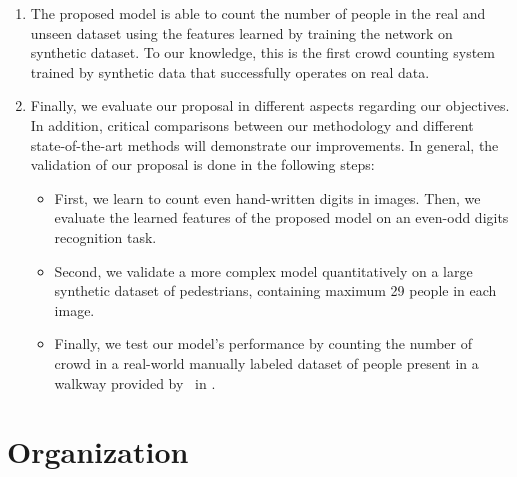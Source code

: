 \begin{enumerate}
	\item The proposed model is able to count the number of people in the real and unseen dataset using the features learned by training the network on synthetic dataset. To our knowledge, this is the first crowd counting system trained by synthetic data that successfully operates on real data. 

	\item Finally, we evaluate our proposal in different aspects regarding our objectives. In addition, critical comparisons between our methodology and different state-of-the-art methods  will demonstrate our improvements. In general, the validation of our proposal is done in the following steps:

	\begin{itemize}
		\item First, we learn to count even hand-written digits in images. Then, we evaluate the learned features of the proposed model on an even-odd digits recognition task. 
		\item Second, we validate a more complex model  quantitatively on a large synthetic dataset of pedestrians, containing maximum 29 people in each image. 
		\item Finally, we test our model's performance by counting the number of crowd in a real-world manually labeled dataset of people present in a walkway provided by~\citeauthor{chan2013ground} in \cite{chan2013ground}. 
	\end{itemize}
	
\end{enumerate}

\section{Organization}

